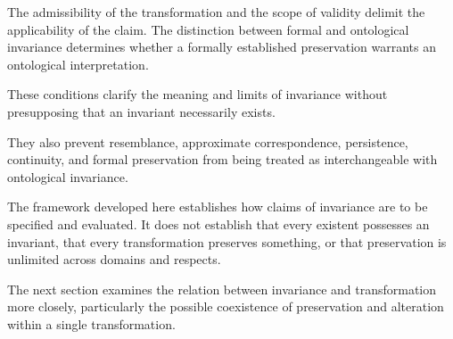 The admissibility of the transformation
and the scope of validity delimit
the applicability of the claim.
The distinction between formal
and ontological invariance determines
whether a formally established
preservation warrants an ontological
interpretation.

These conditions clarify the meaning
and limits of invariance without
presupposing that an invariant
necessarily exists.

They also prevent resemblance,
approximate correspondence, persistence,
continuity, and formal preservation
from being treated as interchangeable
with ontological invariance.

The framework developed here establishes
how claims of invariance are to be
specified and evaluated. It does
not establish that every existent
possesses an invariant, that every
transformation preserves something,
or that preservation is unlimited
across domains and respects.

The next section examines the relation
between invariance and transformation
more closely, particularly the possible
coexistence of preservation and
alteration within a single transformation.

